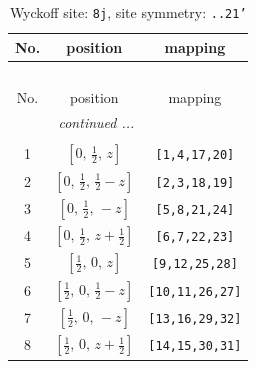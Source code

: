 \documentclass[fleqn,8pt]{jsarticle}
\begin{document}
\begin{longtable}{ccc}
\caption{Wyckoff site: {\tt 8j}, site symmetry: {\tt ..21'}}
 \\
 \hline \hline
No. & position & mapping \\ \hline \endfirsthead

\multicolumn{2}{l}{\tablename\ \thetable{}} \\
 \hline \hline
No. & position & mapping \\ \hline \endhead

 \hline \hline
\multicolumn{2}{r}{\footnotesize\it continued ...} \\ \endfoot

 \hline \hline
\multicolumn{2}{r}{} \\ \endlastfoot

1 & $\left[ 0,\, \frac{1}{2},\, z \right]$ & {\tt [1,4,17,20]} \\ \hline
2 & $\left[ 0,\, \frac{1}{2},\, \frac{1}{2} - z \right]$ & {\tt [2,3,18,19]} \\ \hline
3 & $\left[ 0,\, \frac{1}{2},\, - z \right]$ & {\tt [5,8,21,24]} \\ \hline
4 & $\left[ 0,\, \frac{1}{2},\, z + \frac{1}{2} \right]$ & {\tt [6,7,22,23]} \\ \hline
5 & $\left[ \frac{1}{2},\, 0,\, z \right]$ & {\tt [9,12,25,28]} \\ \hline
6 & $\left[ \frac{1}{2},\, 0,\, \frac{1}{2} - z \right]$ & {\tt [10,11,26,27]} \\ \hline
7 & $\left[ \frac{1}{2},\, 0,\, - z \right]$ & {\tt [13,16,29,32]} \\ \hline
8 & $\left[ \frac{1}{2},\, 0,\, z + \frac{1}{2} \right]$ & {\tt [14,15,30,31]} \\
\end{longtable}
\renewcommand{\arraystretch}{1.2}
\end{document}
